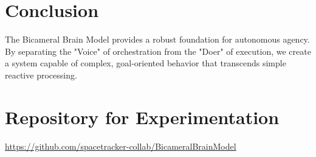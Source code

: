 \documentclass[12pt]{article}
\begin{document}
\section{Conclusion}
The Bicameral Brain Model provides a robust foundation for autonomous agency. By separating the "Voice" of orchestration from the "Doer" of execution, we create a system capable of complex, goal-oriented behavior that transcends simple reactive processing.

\section{Repository for Experimentation}
\noindent
\url{https://github.com/spacetracker-collab/BicameralBrainModel}
\end{document}

